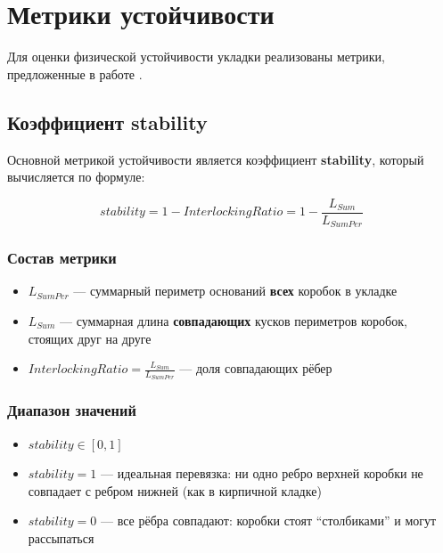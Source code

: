 \section{Метрики устойчивости}

Для оценки физической устойчивости укладки реализованы метрики, предложенные в работе \cite{TR-MFTI-khelvas2019-boxes}.


\subsection{Коэффициент stability}

Основной метрикой устойчивости является коэффициент \textbf{stability}, который вычисляется по формуле:

$$stability = 1 - InterlockingRatio = 1 - \frac{L_{Sum}}{L_{SumPer}}$$

\subsubsection{Состав метрики}

\begin{itemize}
    \item $L_{SumPer}$ --- суммарный периметр оснований \textbf{всех} коробок в укладке
    \item $L_{Sum}$ --- суммарная длина \textbf{совпадающих} кусков периметров коробок, стоящих друг на друге
    \item $InterlockingRatio = \frac{L_{Sum}}{L_{SumPer}}$ --- доля совпадающих рёбер
\end{itemize}

\subsubsection{Диапазон значений}

\begin{itemize}
    \item $stability \in [0, 1]$
    \item $stability = 1$ --- идеальная перевязка: ни одно ребро верхней коробки не совпадает с ребром нижней (как в кирпичной кладке)
    \item $stability = 0$ --- все рёбра совпадают: коробки стоят ``столбиками'' и могут рассыпаться
\end{itemize}

